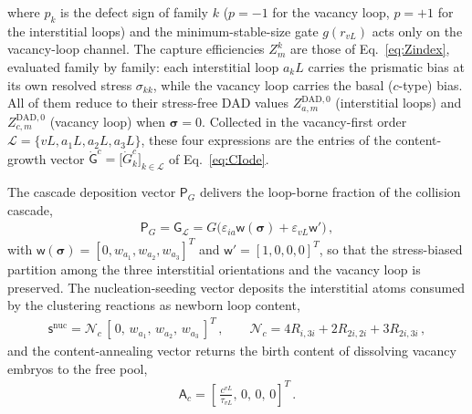 \documentclass{article}
\newcommand{\spvec}[1]{\bm{\mathsf{#1}}}   %
\begin{document}
where $p_k$ is the defect sign of family $k$ ($p=-1$ for the vacancy loop, $p=+1$ for the interstitial loops) and the minimum-stable-size gate $g(r_{vL})$ acts only on the vacancy-loop channel. The capture efficiencies $Z^{k}_{m}$ are those of Eq.~\eqref{eq:Zindex}, evaluated family by family: each interstitial loop $a_kL$ carries the prismatic bias at its own resolved stress $\sigma_{kk}$, while the vacancy loop carries the basal ($c$-type) bias. All of them reduce to their stress-free DAD values $Z^{\mathrm{DAD},0}_{a,m}$ (interstitial loops) and $Z^{\mathrm{DAD},0}_{c,m}$ (vacancy loop) when $\bm\sigma=0$. Collected in the vacancy-first order $\mathcal L=\{vL,a_1L,a_2L,a_3L\}$, these four expressions are the entries of the content-growth vector $\dot{\spvec{G}}^{c}=\bigl[\dot G^{c}_{k}\bigr]_{k\in\mathcal L}$ of Eq.~\eqref{eq:CIode}.

The cascade deposition vector $\spvec{P}_G$ delivers the loop-borne fraction of the collision cascade,
\begin{align}\label{eq:PG}
\spvec{P}_G=\spvec{G}_{\mathcal{L}}=G\big(\varepsilon_{ia}\spvec{w}(\bm\sigma)+\varepsilon_{vL}\spvec{w}'\big)\, ,
\end{align}
with $\spvec{w}(\bm\sigma)=[0,w_{a_1},w_{a_2},w_{a_3}]^T$ and $\spvec{w}'=[1,0,0,0]^T$, so that the stress-biased partition among the three interstitial orientations and the vacancy loop is preserved. The nucleation-seeding vector deposits the interstitial atoms consumed by the clustering reactions as newborn loop content,
\begin{align}
\spvec{s}^{\mathrm{nuc}}=\mathcal{N}_c\,[\,0,\,w_{a_1},\,w_{a_2},\,w_{a_3}\,]^T\, ,\qquad
\mathcal{N}_c=4R_{i,3i}+2R_{2i,2i}+3R_{2i,3i}\, ,
\end{align}
and the content-annealing vector returns the birth content of dissolving vacancy embryos to the free pool,
\begin{align}
\spvec{A}_c=\left[\,\frac{c^{vL}}{\tau_{vL}},\,0,\,0,\,0\right]^T\, .
\end{align}
\end{document}
